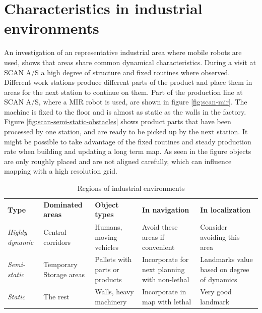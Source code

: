 \section{Characteristics in industrial environments}
\label{sec:characteristics_in_industrial_environments}
An investigation of an representative industrial area where mobile robots are used, shows that areas share common dynamical characteristics. 
During a visit at SCAN A/S a high degree of structure and fixed routines where observed. 
Different work stations produce different parts of the product and place them in areas for the next station to continue on them.
Part of the production line at SCAN A/S, where a MIR robot is used, are shown in figure \ref{fig:scan-mir}. 
The machine is fixed to the floor and is almost as static as the walls in the factory.
Figure \ref{fig:scan-semi-static-obstacles} shows product parts that have been processed by one station, and are ready to be picked up by the next station. 
It might be possible to take advantage of the fixed routines and steady production rate when building and updating a long term map.
As seen in the figure objects are only roughly placed and are not aligned carefully, which can influence mapping with a high resolution grid.

\begin{table}[htbp]
	\caption{Regions of industrial environments}
	\label{tab:regions_of_industrial_environments}
	\begin{center}
		\begin{tabular}{p{} | p{2.6cm} | p{2.6cm} | p{2.6cm} | p{2.6cm}}
			\toprule
			\textbf{Type} & \textbf{Dominated areas} & \textbf{Object types} & \textbf{In navigation} & \textbf{In localization} \\ 
			\rowcolor[gray]{0.925}
			\textit{Highly dynamic} & Central corridors & Humans, moving vehicles & Avoid these areas if convenient & Consider avoiding this area \\
			\textit{Semi-static} & Temporary Storage areas & Pallets with parts or products & Incorporate for next planning with non-lethal & Landmarks value based on degree of dynamics \\ 
			\rowcolor[gray]{0.925}
			\textit{Static} & The rest & Walls, heavy machinery & Incorporate in map with lethal & Very good landmark \\			
			\bottomrule
		\end{tabular} 
	\end{center}
\end{table}

